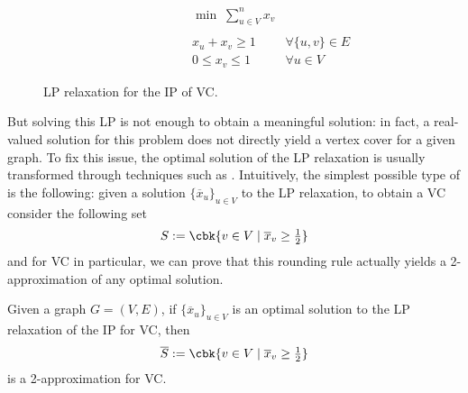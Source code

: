 \documentclass[a4paper, 12pt]{report}
\begin{document}
    \begin{figure}[H]
        \centering
        \[\begin{array}{ccl}
            \qquad\qquad\quad
            & \min \; \displaystyle \sum_{u \in V}^n {x_v} \\\\
            & x_u + x_v \ge 1 & \forall \{u, v\} \in E \\
            & 0 \le x_v \le 1 & \forall u \in V
        \end{array}\]
        \caption{LP relaxation for the IP of VC.}
    \end{figure}

    But solving this LP is not enough to obtain a meaningful solution: in fact, a real-valued solution for this problem does not directly yield a vertex cover for a given graph. To fix this issue, the optimal solution of the LP relaxation is usually transformed through techniques such as . Intuitively, the simplest possible type of  is the following: given a solution $\{\overline x_u\}_{u \in V}$ to the LP relaxation, to obtain a VC consider the following set $$S := \cbk{v \in V \mid \overline x_v \ge \tfrac{1}{2}}$$ and for VC in particular, we can prove that this rounding rule actually yields a 2-approximation of any optimal solution.

    \begin{framedthm}[label={lp 2-approx vc}]{}
        Given a graph $G = (V, E)$, if $\{\overline x_u\}_{u \in V}$ is an optimal solution to the LP relaxation of the IP for VC, then $$\overline S := \cbk{v \in V \mid \overline x_v \ge \tfrac{1}{2}}$$ is a 2-approximation for VC.
    \end{framedthm}
\end{document}

